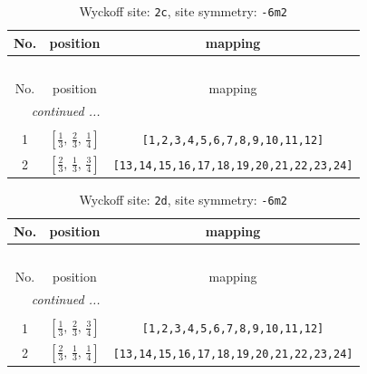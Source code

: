 \documentclass[fleqn,8pt]{jsarticle}
\begin{document}
\renewcommand{\arraystretch}{1.2}
\begin{longtable}{ccc}
\caption{Wyckoff site: {\tt 2c}, site symmetry: {\tt -6m2}}
 \\
 \hline \hline
No. & position & mapping \\ \hline \endfirsthead

\multicolumn{2}{l}{\tablename\ \thetable{}} \\
 \hline \hline
No. & position & mapping \\ \hline \endhead

 \hline \hline
\multicolumn{2}{r}{\footnotesize\it continued ...} \\ \endfoot

 \hline \hline
\multicolumn{2}{r}{} \\ \endlastfoot

1 & $\left[ \frac{1}{3},\, \frac{2}{3},\, \frac{1}{4} \right]$ & {\tt [1,2,3,4,5,6,7,8,9,10,11,12]} \\ \hline
2 & $\left[ \frac{2}{3},\, \frac{1}{3},\, \frac{3}{4} \right]$ & {\tt [13,14,15,16,17,18,19,20,21,22,23,24]} \\
\end{longtable}
\renewcommand{\arraystretch}{1.2}
\begin{longtable}{ccc}
\caption{Wyckoff site: {\tt 2d}, site symmetry: {\tt -6m2}}
 \\
 \hline \hline
No. & position & mapping \\ \hline \endfirsthead

\multicolumn{2}{l}{\tablename\ \thetable{}} \\
 \hline \hline
No. & position & mapping \\ \hline \endhead

 \hline \hline
\multicolumn{2}{r}{\footnotesize\it continued ...} \\ \endfoot

 \hline \hline
\multicolumn{2}{r}{} \\ \endlastfoot

1 & $\left[ \frac{1}{3},\, \frac{2}{3},\, \frac{3}{4} \right]$ & {\tt [1,2,3,4,5,6,7,8,9,10,11,12]} \\ \hline
2 & $\left[ \frac{2}{3},\, \frac{1}{3},\, \frac{1}{4} \right]$ & {\tt [13,14,15,16,17,18,19,20,21,22,23,24]} \\
\end{longtable}
\renewcommand{\arraystretch}{1.2}
\end{document}
